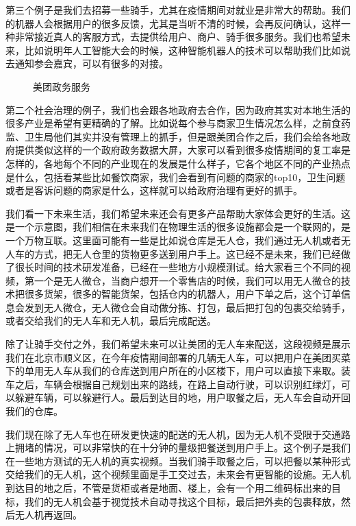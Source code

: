 \documentclass[letterpaper,10pt,english]{sphinxmanual}
\begin{document}
第三个例子是我们去招募一些骑手，尤其在疫情期间对就业是非常大的帮助。我们的机器人会根据用户的很多反馈，尤其是当听不清的时候，会再反问确认，这样一种非常接近真人的客服方式，去提供给用户、商户、骑手很多服务。我们也希望未来，比如说明年人工智能大会的时候，这种智能机器人的技术可以帮助我们比如说去通知参会嘉宾，可以有很多的对接。

\begin{figure}[H]
\centering
\capstart

\noindent{}
\caption{美团政务服务}\label{\detokenize{chapter_AI_company/meituan:id27}}\end{figure}

第二个社会治理的例子，我们也会跟各地政府去合作，因为政府其实对本地生活的很多产业是希望有更精确的了解。比如说每个参与商家卫生情况怎么样，之前食药监、卫生局他们其实并没有管理上的抓手，但是跟美团合作之后，我们会给各地政府提供类似这样的一个政府政务数据大屏，大家可以看到很多疫情期间的复工率是怎样的，各地每个不同的产业现在的发展是什么样子，它各个地区不同的产业热点是什么，包括看某些比如餐饮商家，我们会看到有问题的商家的top10，卫生问题或者是客诉问题的商家是什么，这样就可以给政府治理有更好的抓手。

我们看一下未来生活，我们希望未来还会有更多产品帮助大家体会更好的生活。这是一个示意图，我们相信在未来我们在物理生活的很多设施都会是一个联网的，是一个万物互联。这里面可能有一些是比如说仓库是无人仓，我们通过无人机或者无人车的方式，把无人仓里的货物更多送到用户手上。这已经不是未来，我们已经做了很长时间的技术研发准备，已经在一些地方小规模测试。给大家看三个不同的视频，第一个是无人微仓，当商户想开一个零售店的时候，我们可以用无人微仓的技术把很多货架，很多的智能货架，包括仓内的机器人，用户下单之后，这个订单信息会发到无人微仓，无人微仓会自动做分拣、打包，最后把打包的包裹交给骑手，或者交给我们的无人车和无人机，最后完成配送。

除了让骑手交付之外，我们希望未来可以让美团的无人车来配送，这段视频是展示我们在北京市顺义区，在今年疫情期间部署的几辆无人车，可以把用户在美团买菜下的单用无人车从我们的仓库送到用户所在的小区楼下，用户可以直接下来取。装车之后，车辆会根据自己规划出来的路线，在路上自动行驶，可以识别红绿灯，可以躲避车辆，可以躲避行人。最后到达目的地，用户取餐之后，无人车会自动开回我们的仓库。

我们现在除了无人车也在研发更快速的配送的无人机，因为无人机不受限于交通路上拥堵的情况，可以非常快的在十分钟的量级把餐送到用户手上。这个例子是我们在一些地方测试的无人机的真实视频。当我们骑手取餐之后，可以把餐以某种形式交给我们的无人机，这个视频里面是手工交过去，未来会有更智能的设施。无人机到达目的地之后，不管是货柜或者是地面、楼上，会有一个用二维码标出来的目标，我们的无人机会基于视觉技术自动寻找这个目标，最后把外卖的包裹释放，然后无人机再返回。
\end{document}
